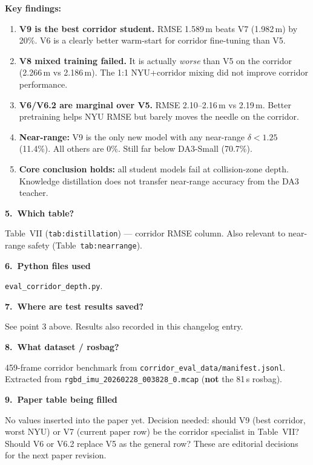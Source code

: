 \documentclass[11pt,a4paper]{article}
\begin{document}
\textbf{Key findings:}

\begin{enumerate}
  \item \textbf{V9 is the best corridor student.}  RMSE 1.589\,m
    beats V7 (1.982\,m) by 20\%.  V6 is a clearly better warm-start
    for corridor fine-tuning than V5.
  \item \textbf{V8 mixed training failed.}  It is actually \emph{worse}
    than V5 on the corridor (2.266\,m vs 2.186\,m).  The 1:1
    NYU+corridor mixing did not improve corridor performance.
  \item \textbf{V6/V6.2 are marginal over V5.}  RMSE 2.10--2.16\,m
    vs 2.19\,m.  Better pretraining helps NYU RMSE but barely moves
    the needle on the corridor.
  \item \textbf{Near-range:} V9 is the only new model with any
    near-range $\delta{<}1.25$ (11.4\%).  All others are 0\%.
    Still far below DA3-Small (70.7\%).
  \item \textbf{Core conclusion holds:} all student models fail at
    collision-zone depth.  Knowledge distillation does not transfer
    near-range accuracy from the DA3 teacher.
\end{enumerate}

\textbf{5.\ Which table?}

Table~VII (\texttt{tab:distillation}) --- corridor RMSE column.
Also relevant to near-range safety (Table~\texttt{tab:nearrange}).

\textbf{6.\ Python files used}

\texttt{eval\_corridor\_depth.py}.

\textbf{7.\ Where are test results saved?}

See point 3 above.  Results also recorded in this changelog entry.

\textbf{8.\ What dataset / rosbag?}

459-frame corridor benchmark from
\texttt{corridor\_eval\_data/manifest.jsonl}.  Extracted from
\texttt{rgbd\_imu\_20260228\_003828\_0.mcap} (\textbf{not} the
81\,s rosbag).

\textbf{9.\ Paper table being filled}

No values inserted into the paper yet.  Decision needed: should V9
(best corridor, worst NYU) or V7 (current paper row) be the corridor
specialist in Table~VII?  Should V6 or V6.2 replace V5 as the general
row?  These are editorial decisions for the next paper revision.

\end{document}
